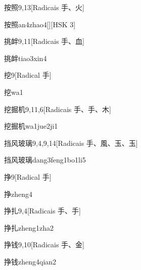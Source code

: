 \begin{entry}{按照}{9,13}[Radicais ⼿、⽕]
  \begin{phonetics}{按照}{an4zhao4}[][HSK 3]
  \end{phonetics}
\end{entry}

\begin{entry}{挑衅}{9,11}[Radicais ⼿、⾎]
  \begin{phonetics}{挑衅}{tiao3xin4}
  \end{phonetics}
\end{entry}

\begin{entry}{挖}{9}[Radical ⼿]
  \begin{phonetics}{挖}{wa1}
  \end{phonetics}
\end{entry}

\begin{entry}{挖掘机}{9,11,6}[Radicais ⼿、⼿、⽊]
  \begin{phonetics}{挖掘机}{wa1jue2ji1}
  \end{phonetics}
\end{entry}

\begin{entry}{挡风玻璃}{9,4,9,14}[Radicais ⼿、⾵、⽟、⽟]
  \begin{phonetics}{挡风玻璃}{dang3feng1bo1li5}
  \end{phonetics}
\end{entry}

\begin{entry}{挣}{9}[Radical ⼿]
  \begin{phonetics}{挣}{zheng4}
  \end{phonetics}
\end{entry}

\begin{entry}{挣扎}{9,4}[Radicais ⼿、⼿]
  \begin{phonetics}{挣扎}{zheng1zha2}
  \end{phonetics}
\end{entry}

\begin{entry}{挣钱}{9,10}[Radicais ⼿、⾦]
  \begin{phonetics}{挣钱}{zheng4qian2}
  \end{phonetics}
\end{entry}

